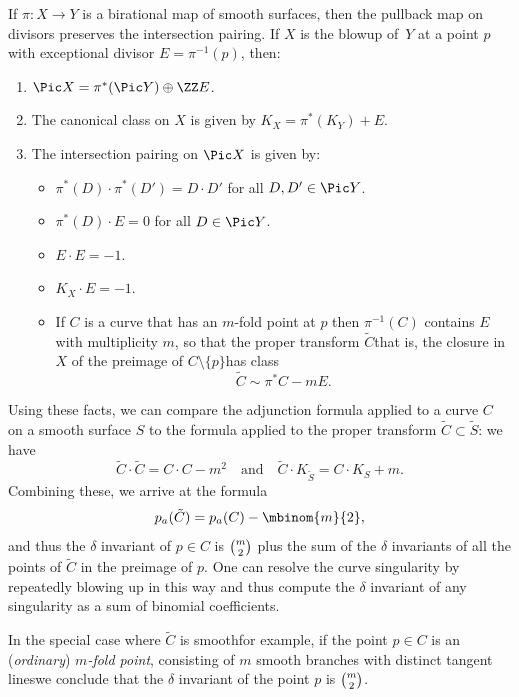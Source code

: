 \begin{theorem}\label{divisor classes on blowup}
If $\pi: X \to Y$ is a birational map of smooth surfaces, then the pullback map on divisors
preserves the intersection pairing. If $X$ is the blowup of~$Y$ at a point $p$ with exceptional
divisor $E = \pi^{-1}(p)$, then:

\begin{enumerate}
 \item $\Pic X =\pi^*(\Pic Y) \oplus \ZZ E$.
\item The canonical class on $X$ is given by $K_X = \pi^*(K_Y)+E$.
 \item The intersection pairing on $\Pic X$ is given by:
 
\begin{itemize}
\item $\pi^*(D)\cdot\pi^*(D') = D\cdot D'$ for all $D,D'\in \Pic Y$.
\item $\pi^*(D)\cdot E = 0$ for all $D\in \Pic Y$.
 \item $E\cdot E = -1$.
 \item $K_X\cdot E = -1$.
 \item If $C$ is a curve that has an $m$-fold point at $p$ then
   $\pi^{-1}(C)$ contains $E$ with multiplicity $m$, so that the 
%
proper transform
 $\tilde C$\emdash that is, the closure in $X$ of the preimage of $C \setminus \{p\}$\emdash has class
 $$
 \tilde C \sim \pi^*C - mE.
 $$
 \end{itemize}
\end{enumerate}
\end{theorem}

Using these facts, we can compare the adjunction formula applied to a curve $C$ on a smooth surface $S$ to the formula applied to the proper transform $\tilde C \subset \tilde S$: we have
$$
\tilde C \cdot \tilde C = C \cdot C - m^2 \quad \text{and} \quad \tilde C \cdot K_{\tilde S} = C \cdot K_S + m.
$$
Combining these, we arrive at the formula
$$
p_a(\tilde C) = p_a(C) - \mbinom{m}{2},
$$
and thus the $\delta$ invariant of $p \in C$ is $\tbinom{m}{2}$ plus the sum of the $\delta$ invariants of all the 
points of $\tilde C$ in the preimage of $p$. One can resolve the curve singularity by repeatedly blowing up in this way and thus compute the $\delta$ invariant
of any singularity as a sum of binomial coefficients.

In the special case where $\tilde C$ is smooth\emdash for example, if
the point $p \in C$ is an (\emph{ordinary}) \emph{$m$-fold point}, consisting
%
%
of $m$ smooth branches with distinct tangent lines\emdash we conclude
that the $\delta$ invariant of the point $p$ is $\tbinom{m}{2}$. 


